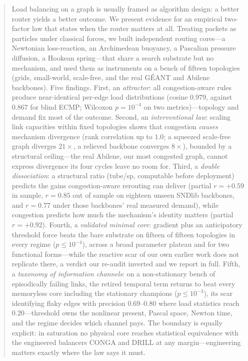 ﻿%
\begin{abstract}
Load balancing on a graph is usually framed as algorithm design: a better
router yields a better outcome. We present evidence for an empirical two-factor law that
states when the router matters at all. Treating packets as particles under
classical forces, we built independent routing cores---a Newtonian
loss-reaction, an Archimedean buoyancy, a Pascalian pressure diffusion, a
Hookean spring---that share a search substrate but no mechanism, and used them
as instruments on a bench of fifteen topologies (grids, small-world,
scale-free, and the real G\'EANT and Abilene backbones). Five findings.
First, an \emph{attractor}: all congestion-aware rules produce near-identical
per-edge load distributions (cosine $0.979$, against $0.867$ for blind ECMP;
Wilcoxon $p=10^{-4}$ on two metrics)---topology and demand fix most of the
outcome. Second, an \emph{interventional law}: scaling link capacities within
fixed topologies shows that congestion \emph{causes} mechanism divergence
(rank correlation up to $1.0$; a squeezed scale-free graph diverges
$21\times$, a relieved backbone converges $8\times$), bounded by a structural
ceiling---the real Abilene, our most congested graph, cannot express
divergence its four cycles leave no room for. Third, a \emph{double
dissociation}: a structural ratio (tube/sp, computable before deployment)
predicts the gains congestion-aware rerouting can deliver (partial $r=+0.59$
in sample, $r=0.85$ out of sample on eighteen unseen SNDlib backbones, and
$r=0.77$ under those backbones' real measured demand),
while congestion predicts how much the mechanism's identity matters (partial
$r=+0.92$). Fourth, a \emph{validated minimal core}: gradient plus an
anticipatory threshold force beats the bare substrate on fifteen of fifteen
topologies in every regime ($p\le10^{-4}$), across a broad parameter plateau
and for two functional forms---while the reactive scar of our own earlier
work does not replicate there, a verdict our re-audit inverted and we report
in full. Fifth, a \emph{taxonomy of information channels}: on a
non-stationary bench of episodically failing links, the retired temporal term
returns to beat every memoryless core including the stationary champions
($p\le10^{-3}$), its scar identifying flaky edges with precision
$0.69$--$0.80$ where load statistics reach $0.20$---threshold owns the
nonlinear present, Pascal space, Newton time, and the regime decides which
channel pays. The boundary is equally explicit: in saturation no physical
core reaches statistical equivalence with the engineered balancers CONGA and
DRILL at any margin---engineering matters exactly where the law says it must.
\end{abstract}
